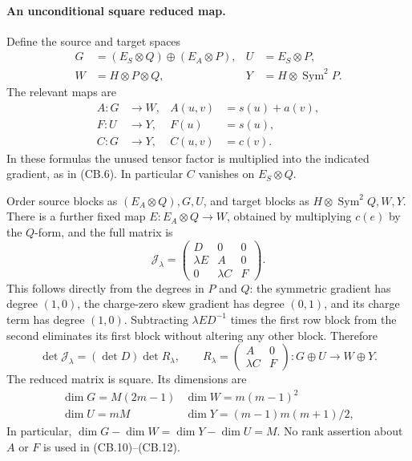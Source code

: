 \paragraph{An unconditional square reduced map.}
Define the source and target spaces
\[
 \begin{aligned}
 G&=(E_S\otimes Q)\oplus(E_A\otimes P),&
 U&=E_S\otimes P,\\
 W&=H\otimes P\otimes Q,&
 Y&=H\otimes\operatorname{Sym}^2P.
 \end{aligned}                                                   \tag{CB.8}
\]
The relevant maps are
\[
 \begin{aligned}
 A:G&\longrightarrow W,&
 A(u,v)&=s(u)+a(v),\\
 F:U&\longrightarrow Y,& F(u)&=s(u),\\
 C:G&\longrightarrow Y,& C(u,v)&=c(v).
 \end{aligned}                                                   \tag{CB.9}
\]
In these formulas the unused tensor factor is multiplied into
the indicated gradient, as in (CB.6). In particular \(C\)
vanishes on \(E_S\otimes Q\).

Order source blocks as \((E_A\otimes Q),G,U\), and target
blocks as \(H\otimes\operatorname{Sym}^2Q,W,Y\).
There is a further fixed map \(E:E_A\otimes Q\to W\), obtained
by multiplying \(c(e)\) by the \(Q\)-form, and the full matrix is
\[
 \mathcal J_\lambda=
 \begin{pmatrix}
       D&0&0\\
       \lambda E&A&0\\
       0&\lambda C&F
 \end{pmatrix}.
                                                               \tag{CB.10}
\]
This follows directly from the degrees in \(P\) and \(Q\):
the symmetric gradient has degree \((1,0)\), the charge-zero
skew gradient has degree \((0,1)\), and its charge term has
degree \((1,0)\).
Subtracting \(\lambda ED^{-1}\) times the first row block from
the second eliminates its first block without altering any
other block. Therefore
\[
 \det\mathcal J_\lambda=(\det D)\det R_\lambda,\qquad
 R_\lambda=\begin{pmatrix}A&0\\ \lambda C&F\end{pmatrix}
                      :G\oplus U\longrightarrow W\oplus Y.
                                                               \tag{CB.11}
\]
The reduced matrix is square. Its dimensions are
\[
 \begin{array}{c|c}
 \dim G=M(2m-1)&\dim W=m(m-1)^2\\
 \dim U=mM&\dim Y=(m-1)m(m+1)/2,
 \end{array}
                                                               \tag{CB.12}
\]
In particular,
\(\dim G-\dim W=\dim Y-\dim U=M\).
No rank assertion about \(A\) or \(F\) is used in
(CB.10)--(CB.12).


